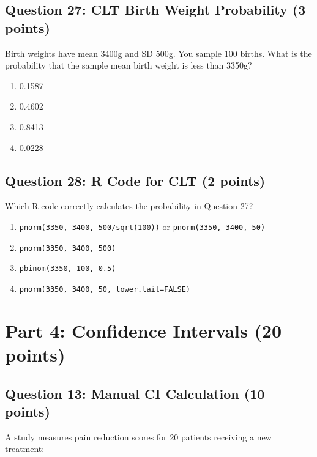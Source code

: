 \documentclass[11pt]{article}
\begin{document}
\subsection*{Question 27: CLT Birth Weight Probability (3 points)}

Birth weights have mean 3400g and SD 500g. You sample 100 births. What is the probability that the sample mean birth weight is less than 3350g?

\begin{enumerate}[label=\Alph*)]
\item 0.1587
\item 0.4602
\item 0.8413
\item 0.0228
\end{enumerate}

\vspace{0.5cm}

\subsection*{Question 28: R Code for CLT (2 points)}

Which R code correctly calculates the probability in Question 27?

\begin{enumerate}[label=\Alph*)]
\item \texttt{pnorm(3350, 3400, 500/sqrt(100))} or \texttt{pnorm(3350, 3400, 50)}
\item \texttt{pnorm(3350, 3400, 500)}
\item \texttt{pbinom(3350, 100, 0.5)}
\item \texttt{pnorm(3350, 3400, 50, lower.tail=FALSE)}
\end{enumerate}

\vspace{0.5cm}

\newpage

\section{Part 4: Confidence Intervals (20 points)}

\subsection*{Question 13: Manual CI Calculation (10 points)}

A study measures pain reduction scores for 20 patients receiving a new treatment:
\end{document}
